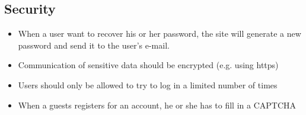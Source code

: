 	\subsection{Security}
		\begin{itemize}
			\item When a user want to recover his or her password, the site will generate a new password and send it to the user's e-mail.
			\item Communication of sensitive data should be encrypted (e.g. using https)
			\item Users should only be allowed to try to log in a limited number of times
			\item When a guests registers for an account, he or she has to fill in a CAPTCHA
		\end{itemize}
